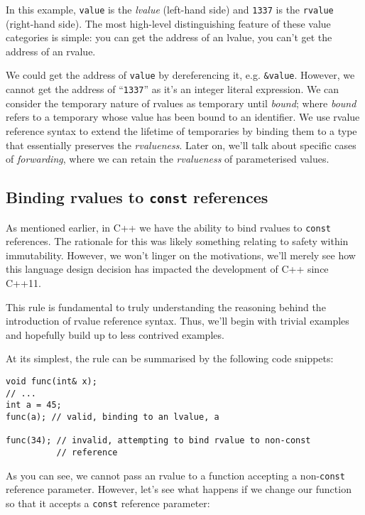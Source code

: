 	In this example, \texttt{value} is the \textit{lvalue} (left-hand side) and
	\texttt{1337} is the \texttt{rvalue} (right-hand side). The most high-level
	distinguishing feature of these value categories is simple: you can get the
	address of an lvalue, you can't get the address of an rvalue.\par

	We could get the address of \texttt{value} by dereferencing it, e.g.
	\texttt{\&value}. However, we cannot get the address of ``\texttt{1337}'' as
	it's an integer literal expression. We can consider the temporary nature of
	rvalues as temporary until \textit{bound}; where \textit{bound} refers to a
	temporary whose value has been bound to an identifier. We use rvalue
	reference syntax to extend the lifetime of temporaries by binding them to a
	type that essentially preserves the \textit{rvalueness}. Later on, we'll
	talk about specific cases of \textit{forwarding}, where we can retain the
	\textit{rvalueness} of parameterised values.
	
	\subsection{Binding rvalues to \texttt{const} references}	
	 
	 	As mentioned earlier, in C++ we have the ability to bind rvalues to
		\texttt{const} references. The rationale for this was likely something
		relating to safety within immutability. However, we won't linger on the
		motivations, we'll merely see how this language design decision has
		impacted the development of C++ since C++11.

		This rule is fundamental to truly understanding the reasoning behind the
		introduction of rvalue reference syntax. Thus, we'll begin with trivial
		examples and hopefully build up to less contrived examples.

		At its simplest, the rule can be summarised by the following code
		snippets:

		\begin{verbatim}
void func(int& x);
// ...
int a = 45;
func(a); // valid, binding to an lvalue, a

func(34); // invalid, attempting to bind rvalue to non-const
          // reference
		\end{verbatim}

		As you can see, we cannot pass an rvalue to a function accepting a
		non-\texttt{const} reference parameter. However, let's see what happens
		if we change our function so that it accepts a \texttt{const} reference
		parameter:

